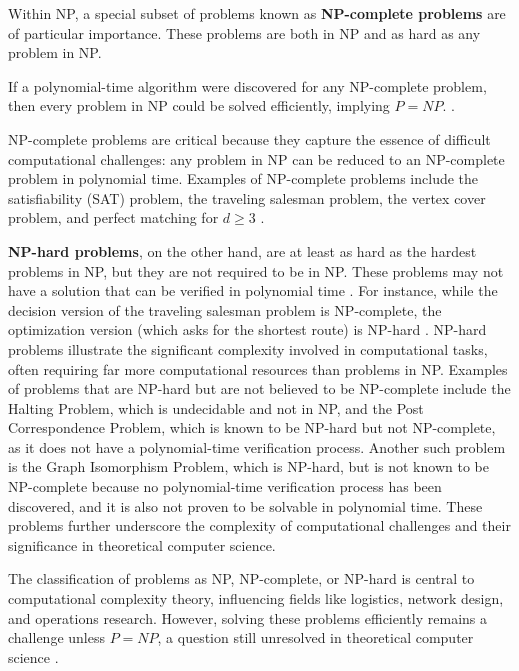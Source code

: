 Within NP, a special subset of problems known as \textbf{NP-complete problems} are of particular importance. These problems are both in NP and as hard as any problem in NP. 
\begin{theorem}
If a polynomial-time algorithm were discovered for any NP-complete problem, then every problem in NP could be solved efficiently, implying \( P = NP \). \cite{fortnow2009status}.
\end{theorem}
NP-complete problems are critical because they capture the essence of difficult computational challenges: any problem in NP can be reduced to an NP-complete problem in polynomial time. Examples of NP-complete problems include the satisfiability (SAT) problem, the traveling salesman problem, the vertex cover problem, and perfect matching for \(d \geq 3\) \cite{hromkovic2020attacking}.

\textbf{NP-hard problems}, on the other hand, are at least as hard as the hardest problems in NP, but they are not required to be in NP. These problems may not have a solution that can be verified in polynomial time \cite{sipser1992history}. For instance, while the decision version of the traveling salesman problem is NP-complete, the optimization version (which asks for the shortest route) is NP-hard \cite{fortnow2009status}. NP-hard problems illustrate the significant complexity involved in computational tasks, often requiring far more computational resources than problems in NP. Examples of problems that are NP-hard but are not believed to be NP-complete include the Halting Problem, which is undecidable and not in NP, and the Post Correspondence Problem, which is known to be NP-hard but not NP-complete, as it does not have a polynomial-time verification process. Another such problem is the Graph Isomorphism Problem, which is NP-hard, but is not known to be NP-complete because no polynomial-time verification process has been discovered, and it is also not proven to be solvable in polynomial time. These problems further underscore the complexity of computational challenges and their significance in theoretical computer science.

The classification of problems as NP, NP-complete, or NP-hard is central to computational complexity theory, influencing fields like logistics, network design, and operations research. However, solving these problems efficiently remains a challenge unless \( P = NP \), a question still unresolved in theoretical computer science \cite{cook2000p}.




